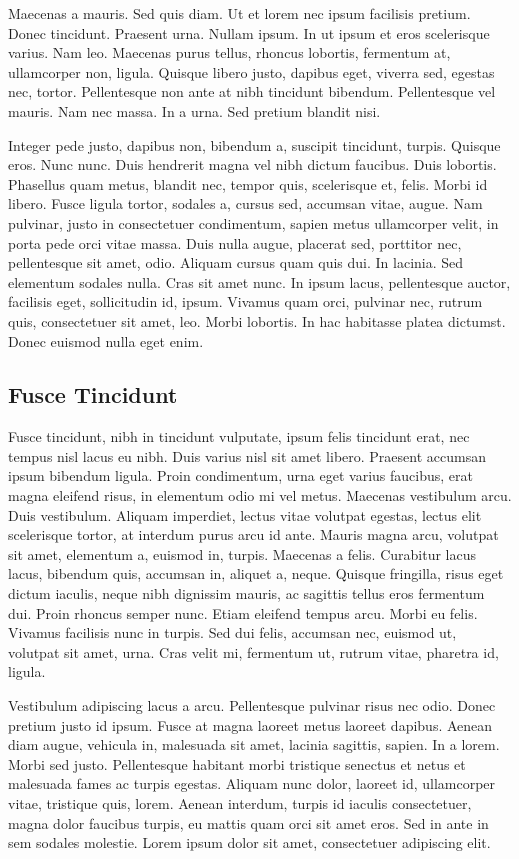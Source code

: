 \documentclass[12pt]{article}
\begin{document}
Maecenas a mauris. Sed quis diam. Ut et lorem nec ipsum facilisis pretium. Donec tincidunt. Praesent urna. Nullam ipsum. In ut ipsum et eros scelerisque varius. Nam leo. Maecenas purus tellus, rhoncus lobortis, fermentum at, ullamcorper non, ligula. Quisque libero justo, dapibus eget, viverra sed, egestas nec, tortor. Pellentesque non ante at nibh tincidunt bibendum. Pellentesque vel mauris. Nam nec massa. In a urna. Sed pretium blandit nisi. \cite{test2}

Integer pede justo, dapibus non, bibendum a, suscipit tincidunt, turpis. Quisque eros. Nunc nunc. Duis hendrerit magna vel nibh dictum faucibus. Duis lobortis. Phasellus quam metus, blandit nec, tempor quis, scelerisque et, felis. Morbi id libero. Fusce ligula tortor, sodales a, cursus sed, accumsan vitae, augue. Nam pulvinar, justo in consectetuer condimentum, sapien metus ullamcorper velit, in porta pede orci vitae massa. Duis nulla augue, placerat sed, porttitor nec, pellentesque sit amet, odio. Aliquam cursus quam quis dui. In lacinia. Sed elementum sodales nulla. Cras sit amet nunc. In ipsum lacus, pellentesque auctor, facilisis eget, sollicitudin id, ipsum. Vivamus quam orci, pulvinar nec, rutrum quis, consectetuer sit amet, leo. Morbi lobortis. In hac habitasse platea dictumst. Donec euismod nulla eget enim. 

\subsection{Fusce Tincidunt}
Fusce tincidunt, nibh in tincidunt vulputate, ipsum felis tincidunt erat, nec tempus nisl lacus eu nibh. Duis varius nisl sit amet libero. Praesent accumsan ipsum bibendum ligula. Proin condimentum, urna eget varius faucibus, erat magna eleifend risus, in elementum odio mi vel metus. Maecenas vestibulum arcu. Duis vestibulum. Aliquam imperdiet, lectus vitae volutpat egestas, lectus elit scelerisque tortor, at interdum purus arcu id ante. Mauris magna arcu, volutpat sit amet, elementum a, euismod in, turpis. Maecenas a felis. Curabitur lacus lacus, bibendum quis, accumsan in, aliquet a, neque. Quisque fringilla, risus eget dictum iaculis, neque nibh dignissim mauris, ac sagittis tellus eros fermentum dui. Proin rhoncus semper nunc. Etiam eleifend tempus arcu. Morbi eu felis. Vivamus facilisis nunc in turpis. Sed dui felis, accumsan nec, euismod ut, volutpat sit amet, urna. Cras velit mi, fermentum ut, rutrum vitae, pharetra id, ligula.

Vestibulum adipiscing lacus a arcu. Pellentesque pulvinar risus nec odio. Donec pretium justo id ipsum. Fusce at magna laoreet metus laoreet dapibus. Aenean diam augue, vehicula in, malesuada sit amet, lacinia sagittis, sapien. In a lorem. Morbi sed justo. Pellentesque habitant morbi tristique senectus et netus et malesuada fames ac turpis egestas. Aliquam nunc dolor, laoreet id, ullamcorper vitae, tristique quis, lorem. Aenean interdum, turpis id iaculis consectetuer, magna dolor faucibus turpis, eu mattis quam orci sit amet eros. Sed in ante in sem sodales molestie. Lorem ipsum dolor sit amet, consectetuer adipiscing elit.
\end{document}

